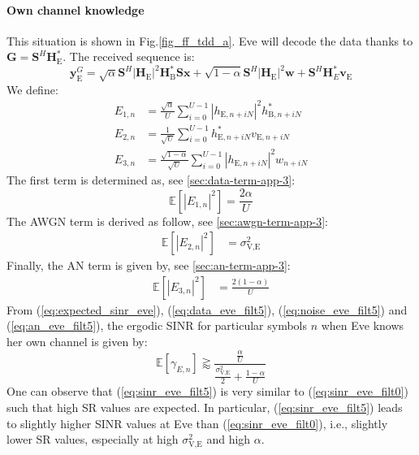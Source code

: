 \documentclass[journal,comsoc]{IEEEtran}
\newcommand{\module}[1]{\left|#1\right|}
\newcommand{\EX}[1]{\mathbb{E} \left[#1\right]}%
\newcommand{\HE}{\textbf{H}_{\text{E}}}
\newcommand{\HB}{\textbf{H}_{\text{B}}}
\newcommand{\ve}{\textbf{v}_{\text{E}}}
\newcommand{\spread}{\textbf{S}}
\newcommand{\w}{\textbf{w}}
\begin{document}
\paragraph{Own channel knowledge}
\label{sec:own-channel-knowledge}
This situation is shown in Fig.\ref{fig_ff_tdd_a}. Eve will decode the data thanks to $\textbf{G} = \spread^H \HE^*$. The received sequence is:
\begin{equation}
	\textbf{y}_{\text{E}}^G = \sqrt{\alpha} \spread^H \module{\HE}^2 \HB^* \spread\textbf{x} +  \sqrt{1-\alpha} \spread^H \module{\HE}^2 \w  +  \spread^H  \textbf{H}^*_E  \ve
	\label{eq:rx_eve_filt5}
\end{equation}
We define: 
\begin{equation}
\begin{split}
E_{1,n} &= \frac{\sqrt{\alpha}}{U}\sum_{i=0}^{U-1}  \left|h_{\text{E}, n + iN}\right|^2  h_{\text{B}, n + iN}^* \\
E_{2,n} &= \frac{1}{\sqrt{U}}\sum_{i=0}^{U-1} h^*_{\text{E}, n + iN}  v_{\text{E}, n + iN}\\
E_{3,n} &=\frac{ \sqrt{1-\alpha}  }{\sqrt{U}}\sum_{i=0}^{U-1}   \left|h_{\text{E}, n + iN}\right|^2 w_{n + iN}
\end{split}
\end{equation}
The first term is determined as, see \ref{sec:data-term-app-3}:
\begin{equation}
\EX{|E_{1,n}|^2} = \frac{2\alpha}{U}
\label{eq:data_eve_filt5}
\end{equation}
The AWGN term is derived as follow, see \ref{sec:awgn-term-app-3}:
\begin{equation}
\begin{split}
\EX{|E_{2,n}|^2} &= \sigma^2_{\text{V,E}}
\end{split}
\label{eq:noise_eve_filt5}
\end{equation}
Finally, the AN term is given by, see \ref{sec:an-term-app-3}:
\begin{equation}
\begin{split}
\EX{|E_{3,n}|^2}  &=  \frac{2(1-\alpha)}{U}
\end{split}
\label{eq:an_eve_filt5}
\end{equation}
From (\ref{eq:expected_sinr_eve}), (\ref{eq:data_eve_filt5}), (\ref{eq:noise_eve_filt5}) and (\ref{eq:an_eve_filt5}),  the ergodic SINR for particular symbols $n$ when Eve knows her own channel is given by:
\begin{equation}
\EX{\gamma_{E,n}} \gtrapprox \frac{\frac{\alpha }{U}}{\frac{\sigma^2_{\text{V,E}}}{2} + \frac{1-\alpha}{U}}
\label{eq:sinr_eve_filt5}
\end{equation}
One can observe that (\ref{eq:sinr_eve_filt5}) is very similar to (\ref{eq:sinr_eve_filt0}) such that high SR values are expected. In particular, (\ref{eq:sinr_eve_filt5}) leads to slightly higher SINR values at Eve than (\ref{eq:sinr_eve_filt0}), i.e., slightly lower SR values, especially at high $\sigma^2_{\text{V,E}}$ and high $\alpha$. 
\end{document}
